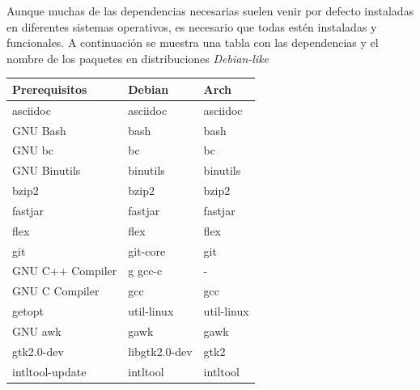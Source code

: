 \documentclass[12pt]{article}
\begin{document}
        Aunque muchas de las dependencias necesarias suelen venir por defecto instaladas en diferentes sistemas operativos, es necesario que todas estén instaladas y funcionales. A continuación se muestra una tabla con las dependencias y el nombre de los paquetes en distribuciones \textit{Debian-like} 

            \begin{tabular}{|l|l|l|}
                \hline
                \textbf{Prerequisitos}  & \textbf{Debian}   & \textbf{Arch}             \\           
                \hline
                asciidoc                & asciidoc          & asciidoc                  \\
                GNU Bash                & bash              & bash                      \\
                GNU bc                  & bc                & bc                        \\
                GNU Binutils            & binutils          & binutils                  \\
                bzip2                   & bzip2             & bzip2                     \\
                fastjar                 & fastjar           & fastjar                   \\
                flex                    & flex              & flex                      \\
                git                     & git-core          & git                       \\
                GNU C++ Compiler        & g gcc-c           & -                         \\
                GNU C Compiler          & gcc               & gcc                       \\
                getopt                  & util-linux        & util-linux                \\
                GNU awk                 & gawk              & gawk                      \\
                gtk2.0-dev              & libgtk2.0-dev     & gtk2                      \\
                intltool-update         & intltool          & intltool                  \\

\end{tabular}
\end{document}
